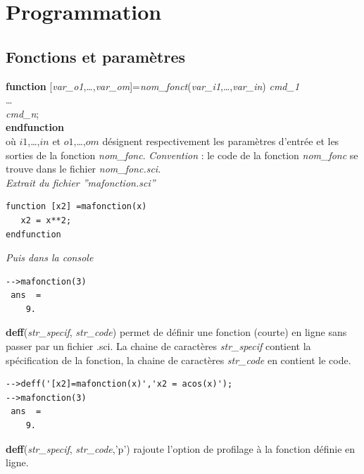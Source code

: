 \documentclass{article}
\begin{document}
\begin{multicols}{3}
\begin{description}
\end{description}


\section{Programmation}
\subsection{Fonctions et paramètres}
\label{fonctions}
\begin{description}
\item{\textbf{function} [\textit{var\_o1},\ldots,\textit{var\_om}]=\textit{nom\_fonct}(\textit{var\_i1},\ldots,\textit{var\_in})}
	 \textit{cmd\_1}\\ \ldots\\\textit{cmd\_n};\\
\hspace*{-7mm}\textbf{endfunction}\\
où $i1$,\ldots,$in$  et $o1$,\ldots,$om$ désignent respectivement les paramètres d'entrée et les sorties de la fonction \textit{nom\_fonc}. \emph{Convention} : le code de la fonction \textit{nom\_fonc} se trouve dans le fichier \textit{nom\_fonc.sci}.\\

\emph{Extrait du fichier ''mafonction.sci''}
\begin{verbatim}
function [x2] =mafonction(x)
   x2 = x**2;
endfunction
\end{verbatim}
\vspace{3mm}
\emph{Puis dans la console}
\begin{verbatim}
-->mafonction(3)
 ans  =
    9.
\end{verbatim}

\item{\label{deff}\textbf{deff}(\textit{str\_specif}, \textit{str\_code})} permet de définir une fonction (courte) en ligne sans passer par un fichier .sci. La chaine de caractères \textit{str\_specif} contient la spécification de la fonction, la chaine de caractères \textit{str\_code} en contient le code.
\begin{verbatim}
-->deff('[x2]=mafonction(x)','x2 = acos(x)');
-->mafonction(3)
 ans  =
    9.
\end{verbatim}
\item{\textbf{deff}(\textit{str\_specif}, \textit{str\_code},'p')} rajoute l'option de profilage à la fonction définie en ligne.
\end{description}


\end{multicols}
\end{document}
